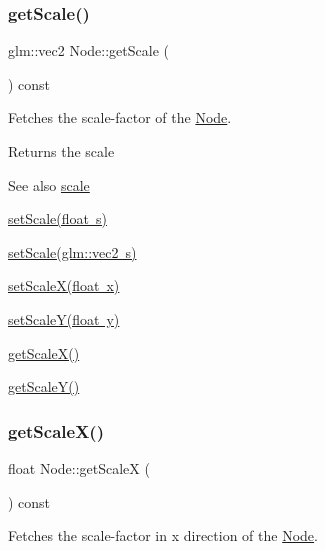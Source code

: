 \subsubsection{\texorpdfstring{getScale()}{getScale()}}
{\footnotesize\ttfamily glm\+::vec2 Node\+::get\+Scale (\begin{DoxyParamCaption}{ }\end{DoxyParamCaption}) const}



Fetches the scale-\/factor of the \mbox{\hyperlink{classsage_1_1Node}{Node}}. 

\begin{DoxyReturn}{Returns}
the scale 
\end{DoxyReturn}
\begin{DoxySeeAlso}{See also}
\mbox{\hyperlink{classsage_1_1Node_a3014b585d97d3a449e83bc0252db0c50}{scale}} 

\mbox{\hyperlink{classsage_1_1Node_a939698b2eb68ee5b60b91e2426e95369}{set\+Scale(float s)}} 

\mbox{\hyperlink{classsage_1_1Node_aecff30b003ce1c2266cc60a34b72559d}{set\+Scale(glm\+::vec2 s)}} 

\mbox{\hyperlink{classsage_1_1Node_ab8126397f90ccdee0755b984b26809d8}{set\+Scale\+X(float x)}} 

\mbox{\hyperlink{classsage_1_1Node_afa22161545d63e9e011f8eeb5acdead7}{set\+Scale\+Y(float y)}} 

\mbox{\hyperlink{classsage_1_1Node_a27040ef8ab59ccf42b87d6ddc8d794e6}{get\+Scale\+X()}} 

\mbox{\hyperlink{classsage_1_1Node_ab87661ab8940512baf2e7639ea55ff87}{get\+Scale\+Y()}} 
\end{DoxySeeAlso}
\mbox{\label{classsage_1_1Node_a27040ef8ab59ccf42b87d6ddc8d794e6}} 
\subsubsection{\texorpdfstring{getScaleX()}{getScaleX()}}
{\footnotesize\ttfamily float Node\+::get\+ScaleX (\begin{DoxyParamCaption}{ }\end{DoxyParamCaption}) const}



Fetches the scale-\/factor in x direction of the \mbox{\hyperlink{classsage_1_1Node}{Node}}. 

